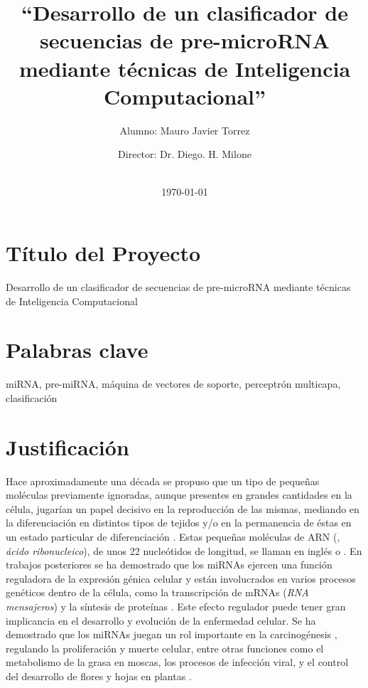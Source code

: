 \documentclass[12pt,bibliography=oldstyle,DIV=12,parskip=full-,titlepage]{scrartcl}
\begin{document}
%
\titlehead{\center\large Universidad Nacional del Litoral\\
  Facultad de Ingeniería y Ciencias Hídricas}
%
\subject{Propuesta de Proyecto Final de Carrera\\Ingeniería en
  Informática}
%
\title{\LARGE ``Desarrollo de un clasificador de secuencias de pre-microRNA
  mediante técnicas de Inteligencia Computacional''}
%
%
\author{{Alumno: Mauro Javier Torrez}\and{Director: Dr. Diego. H. Milone}}
%
\date{\-\\[2em]\today}
\renewcommand*{\titlepagestyle}{empty}
\maketitle
\setcounter{page}{1}
%
%
\section{Título del Proyecto}
Desarrollo de un clasificador de
secuencias de pre-microRNA mediante
técnicas de Inteligencia Computacional
%
%
\section{Palabras clave}
miRNA, pre-miRNA, máquina de vectores
de soporte, perceptrón multicapa, clasificación
%
%
\section{Justificación}
%
%
Hace aproximadamente una década se propuso que un tipo de pequeñas
moléculas previamente ignoradas, aunque presentes en grandes
cantidades en la célula, jugarían un papel decisivo en la reproducción
de las mismas, mediando en la diferenciación en distintos tipos de
tejidos y/o en la permanencia de éstas en un estado particular de
diferenciación \cite{lee-mammal}. Estas pequeñas moléculas de ARN
(, \emph{ácido ribonucleico}), de unos 22 nucleótidos de
longitud, se llaman en inglés  o .  En
trabajos posteriores se ha demostrado que los miRNAs ejercen una
función reguladora de la expresión génica celular \cite{bartel116} y
están involucrados en varios procesos genéticos dentro de la célula,
como la transcripción de mRNAs (\emph{RNA mensajeros}) y la síntesis
de proteínas \cite{lili}.  Este efecto regulador puede tener gran
implicancia en el desarrollo y evolución de la enfermedad celular. Se
ha demostrado que los miRNAs juegan un rol importante en la
carcinogénesis \cite{aurora}\cite{lili}, regulando la proliferación y
muerte celular, entre otras funciones como el metabolismo de la grasa
en moscas, los procesos de infección viral, y el control del
desarrollo de flores y hojas en plantas
\cite{bartel116}\cite{lecellier}.
\end{document}
